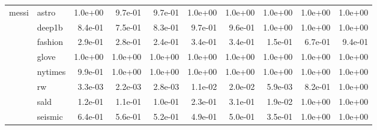 \begin{tabular}{llrrrrrrrr}
\cline{1-10}
\multirow[t]{8}{*}{messi} & astro & 1.0e+00 & 9.7e-01 & 9.7e-01 & 1.0e+00 & 1.0e+00 & 1.0e+00 & 1.0e+00 & 1.0e+00 \\
 & deep1b & 8.4e-01 & 7.5e-01 & 8.3e-01 & 9.7e-01 & 9.6e-01 & 1.0e+00 & 1.0e+00 & 1.0e+00 \\
 & fashion & 2.9e-01 & 2.8e-01 & 2.4e-01 & 3.4e-01 & 3.4e-01 & 1.5e-01 & 6.7e-01 & 9.4e-01 \\
 & glove & 1.0e+00 & 1.0e+00 & 1.0e+00 & 1.0e+00 & 1.0e+00 & 1.0e+00 & 1.0e+00 & 1.0e+00 \\
 & nytimes & 9.9e-01 & 1.0e+00 & 1.0e+00 & 1.0e+00 & 1.0e+00 & 1.0e+00 & 1.0e+00 & 1.0e+00 \\
 & rw & 3.3e-03 & 2.2e-03 & 2.8e-03 & 1.1e-02 & 2.0e-02 & 5.9e-03 & 8.2e-01 & 1.0e+00 \\
 & sald & 1.2e-01 & 1.1e-01 & 1.0e-01 & 2.3e-01 & 3.1e-01 & 1.9e-02 & 1.0e+00 & 1.0e+00 \\
 & seismic & 6.4e-01 & 5.6e-01 & 5.2e-01 & 4.9e-01 & 5.0e-01 & 3.5e-01 & 1.0e+00 & 1.0e+00 \\
\cline{1-10}
\bottomrule
\end{tabular}
